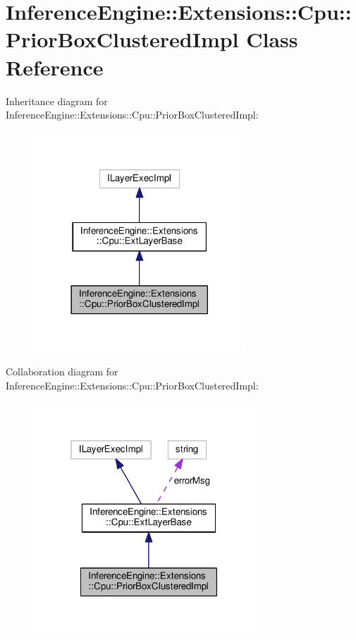 \hypertarget{classInferenceEngine_1_1Extensions_1_1Cpu_1_1PriorBoxClusteredImpl}{}\section{Inference\+Engine\+:\+:Extensions\+:\+:Cpu\+:\+:Prior\+Box\+Clustered\+Impl Class Reference}
\label{classInferenceEngine_1_1Extensions_1_1Cpu_1_1PriorBoxClusteredImpl}


Inheritance diagram for Inference\+Engine\+:\+:Extensions\+:\+:Cpu\+:\+:Prior\+Box\+Clustered\+Impl\+:
\nopagebreak
\begin{figure}[H]
\begin{center}
\leavevmode
\includegraphics[width=225pt]{classInferenceEngine_1_1Extensions_1_1Cpu_1_1PriorBoxClusteredImpl__inherit__graph}
\end{center}
\end{figure}


Collaboration diagram for Inference\+Engine\+:\+:Extensions\+:\+:Cpu\+:\+:Prior\+Box\+Clustered\+Impl\+:
\nopagebreak
\begin{figure}[H]
\begin{center}
\leavevmode
\includegraphics[width=235pt]{classInferenceEngine_1_1Extensions_1_1Cpu_1_1PriorBoxClusteredImpl__coll__graph}
\end{center}
\end{figure}
